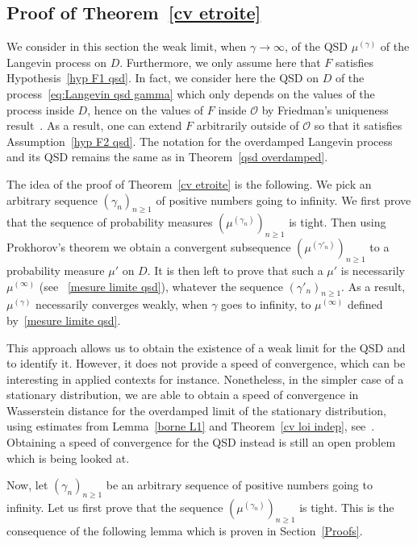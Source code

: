 \documentclass[preprint,EJP]{ejpecp}
\begin{document}
\subsection{Proof of Theorem~\ref{cv etroite}}\label{proof cv etroite}

We consider in this section the weak limit, when $\gamma\rightarrow\infty$, of the QSD $\mu^{(\gamma)}$ of the Langevin process on $D$. Furthermore, we only assume here that $F$ satisfies Hypothesis~\ref{hyp F1 qsd}. In fact, we consider here the QSD on $D$ of the process~\eqref{eq:Langevin qsd gamma} which only depends on the values of the process inside $D$, hence on the values of $F$ inside $\mathcal{O}$ by Friedman's uniqueness result~\cite[Theorem 5.2.1.]{F}. As a result, one can extend $F$ arbitrarily outside of $\mathcal{O}$ so that it satisfies Assumption~\ref{hyp F2 qsd}. The notation for the overdamped Langevin process and its QSD remains the same as in Theorem~\ref{qsd overdamped}.

The idea of the proof of Theorem~\ref{cv etroite} is the following. We pick an arbitrary sequence $(\gamma_n)_{n\geq1}$ of positive numbers going to infinity. We first prove that the sequence of probability measures $(\mu^{(\gamma_n)})_{n\geq1}$ is tight. Then using Prokhorov's theorem we obtain a convergent subsequence $(\mu^{(\gamma'_n)})_{n\geq1}$ to a probability measure $\mu'$ on $D$. It is then left to prove that such a $\mu'$ is necessarily $\mu^{(\infty)}$ (see
~\eqref{mesure limite qsd}), whatever the sequence $(\gamma'_n)_{n\geq1}$. As a result, $\mu^{(\gamma)}$ necessarily converges weakly, when $\gamma$ goes to infinity, to $\mu^{(\infty)}$ defined by~\eqref{mesure limite qsd}.

This approach allows us to obtain the existence of a weak limit for the QSD and to identify it. However, it does not provide a speed of convergence, which can be interesting in applied contexts for instance. Nonetheless, in the simpler case of a stationary distribution, we are able to obtain a speed of convergence in Wasserstein distance for the overdamped limit of the stationary distribution, using estimates from Lemma~\ref{borne L1} and Theorem~\ref{cv loi indep}, see~\cite{MonRam}. Obtaining a speed of convergence for the QSD instead is still an open problem which is being looked at.

Now, let $(\gamma_n)_{n\geq1}$ be an arbitrary sequence of positive numbers going to infinity. Let us first prove that the sequence  $(\mu^{(\gamma_n)})_{n\geq1}$ is tight. This is the consequence of the following lemma which is proven in Section~\ref{Proofs}.  
\end{document}
